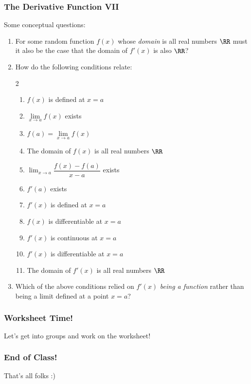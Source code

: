 \documentclass{ltx-talk}
\begin{document}
\begin{frame}
  \frametitle{The Derivative Function VII}

  Some conceptual questions: \pause
  \begin{enumerate}
    \item For some random function $f(x)$ whose \textit{domain} is all real numbers $\RR$ \pause must it also be the case that the domain of $f'(x)$ is also $\RR$? \pause
    \item How do the following conditions relate: \pause
      \begin{multicols}{2}
      \begin{enumerate}
        \item $f(x)$ is defined at $x = a$ 
        \item $\lim\limits_{x \rightarrow a} f(x)$ exists
        \item $f(a) = \lim\limits_{x \rightarrow a} f(x)$
        \item The domain of $f(x)$ is all real numbers $\RR$
        \item $\lim_{x \rightarrow a} \dfrac{f(x) - f(a)}{x - a}$ exists
        \item $f'(a)$ exists
        \item $f'(x)$ is defined at $x = a$
        \item $f(x)$ is differentiable at $x = a$
        \item $f'(x)$ is continuous at $x = a$
        \item $f'(x)$ is differentiable at $x = a$
        \item The domain of $f'(x)$ is all real numbers $\RR$
      \end{enumerate}
      \end{multicols} \pause
    \item Which of the above conditions relied on $f'(x)$ \textit{being a function} rather than being a limit defined at a point $x = a$?
  \end{enumerate}
\end{frame}

\begin{frame}
  \frametitle{Worksheet Time!}
  Let's get into groups and work on the worksheet!
\end{frame}

\begin{frame}
  \frametitle{End of Class!}
  That's all folks :)
\end{frame}
\end{document}
